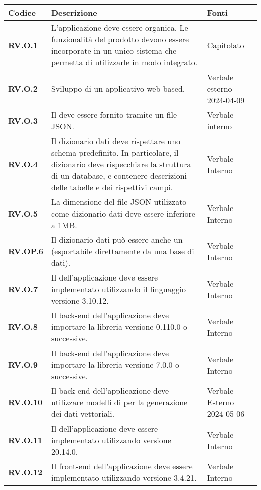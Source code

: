 \begin{longtable}{|P{3cm}|P{6,5cm}|>{\arraybackslash}P{4cm}|}
  \hline
  \textbf{Codice} & \textbf{Descrizione} & \textbf{Fonti} \\
  \hline
  \textbf{RV.O.1} & L'applicazione deve essere organica. Le funzionalità del prodotto devono essere incorporate in un unico sistema che permetta di utilizzarle in modo integrato. & Capitolato \\
  \hline
  \textbf{RV.O.2} & Sviluppo di un applicativo web-based. & Verbale esterno 2024-04-09 \\
  \hline
  \textbf{RV.O.3} & Il  deve essere fornito tramite un file JSON. & Verbale interno \\
  \hline
  \textbf{RV.O.4} & Il dizionario dati deve rispettare uno schema predefinito. In particolare, il dizionario deve rispecchiare la struttura di un database, e contenere descrizioni delle tabelle e dei rispettivi campi. & Verbale Interno \\
  \hline
  \textbf{RV.O.5} & La dimensione del file JSON utilizzato come dizionario dati deve essere inferiore a 1MB. & Verbale Interno \\
  \hline
  \textbf{RV.OP.6} & Il dizionario dati può essere anche un  (esportabile direttamente da una base di dati). & Verbale Interno \\
  \hline
  \textbf{RV.O.7} & Il  dell'applicazione deve essere implementato utilizzando il linguaggio  versione 3.10.12. & Verbale Interno \\
  \hline
  \textbf{RV.O.8} & Il back-end dell'applicazione deve importare la libreria  versione 0.110.0 o successive. & Verbale Interno \\
  \hline
  \textbf{RV.O.9} & Il back-end dell'applicazione deve importare la libreria  versione 7.0.0 o successive. & Verbale Interno \\
  \hline
  \textbf{RV.O.10} & Il back-end dell'applicazione deve utilizzare modelli di  per la generazione dei dati vettoriali. & Verbale Esterno 2024-05-06 \\
  \hline
  \textbf{RV.O.11} & Il  dell'applicazione deve essere implementato utilizzando  versione 20.14.0. & Verbale Interno \\
  \hline
  \textbf{RV.O.12} & Il front-end dell'applicazione deve essere implementato utilizzando  versione 3.4.21. & Verbale Interno \\

\end{longtable}
